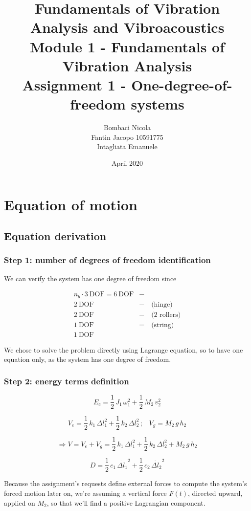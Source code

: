\documentclass[a4paper,12pt,oneside]{article}
\title{Fundamentals of Vibration Analysis and Vibroacoustics \\
Module 1 - Fundamentals of Vibration Analysis \\
Assignment 1 - One-degree-of-freedom systems}
\author{Bombaci Nicola \\
Fantin Jacopo 10591775 \\
Intagliata Emanuele}
\date{April 2020}
\begin{document}
\maketitle

\section{Equation of motion}

\subsection{Equation derivation}

\subsubsection*{Step 1: number of degrees of freedom identification}

We can verify the system has one degree of freedom since

\[ \begin{split}
n_b \cdot 3 ~ \text{DOF} = 6 ~ \text{DOF} & - \\
2 ~ \text{DOF} & - \quad \text{(hinge)} \\
2 ~ \text{DOF}  & - \quad \text{(2 rollers)} \\
1 ~ \text{DOF} & = \quad \text{(string)} \\
1 ~ \text{DOF}
\end{split} \]

We chose to solve the problem directly using Lagrange equation, so to have one equation only, as the system has one degree of freedom.

\subsubsection*{Step 2: energy terms definition}

\[ E_c = \frac{1}{2} \, J_1 \, \omega_1^2 + \frac{1}{2} \, M_2 \, v_2^2 \]

\[
V_e = \frac{1}{2} \, k_1 \, \Delta l_1^2 + %
  \frac{1}{2} \, k_2 \, \Delta l_2^2 \, \text{;} \quad V_g = M_2 \, g \, h_2
\]

\[
\Rightarrow V = V_e + V_g = %
  \frac{1}{2} \, k_1 \, \Delta l_1^2 + \frac{1}{2} \, k_2 \, \Delta l_2^2 %
  + M_2 \, g \, h_2
\]

\[
D = \frac{1}{2} \, c_1 \, \dot{\Delta l_1}^2 + %
  \frac{1}{2} \, c_2 \, \dot{\Delta l_2}^2
\]

Because the assignment's requests define external forces to compute the system's forced motion later on, we're assuming a vertical force $ F(t) $, directed upward, applied on $ M_2 $, so that we'll find a positive Lagrangian component.
\end{document}
